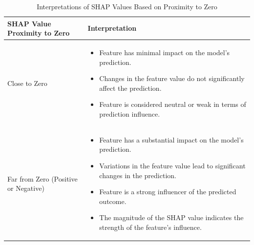 \documentclass[10pt, conference, a4paper, final]{IEEEtran}
\begin{document}
    \begin{table}[t]
        \centering
        \begin{tabular}{|p{3cm}|p{6cm}|}
        \hline
        \textbf{SHAP Value Proximity to Zero} & \textbf{Interpretation} \\ \hline
        Close to Zero & 
        \begin{itemize}
        \item Feature has minimal impact on the model's prediction.
        \item Changes in the feature value do not significantly affect the prediction.
        \item Feature is considered neutral or weak in terms of prediction influence.
        \end{itemize}
        \\ \hline
        Far from Zero (Positive or Negative) & 
        \begin{itemize}
        \item Feature has a substantial impact on the model's prediction.
        \item Variations in the feature value lead to significant changes in the prediction.
        \item Feature is a strong influencer of the predicted outcome.
        \item The magnitude of the SHAP value indicates the strength of the feature's influence.
        \end{itemize}
        \\ \hline
        \end{tabular}
        \caption{Interpretations of SHAP Values Based on Proximity to Zero}
        \label{table:shap-value-interpretation}
    \end{table}
    
    


\end{document}
